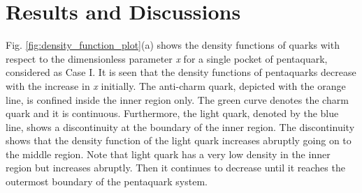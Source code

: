 \documentclass[fleqn]{article}
\begin{document}
\section{Results and Discussions}
     
    Fig. \ref{fig:density_function_plot}(a) shows the density functions of quarks with respect to the dimensionless parameter \textit{x} for a single pocket of pentaquark, considered as Case I. It is seen that the density functions of pentaquarks decrease with the increase in \textit{x} initially. The anti-charm quark, depicted with the orange line, is confined inside the inner region only. The green curve denotes the charm quark and it is continuous. Furthermore, the light quark, denoted by the blue line, shows a discontinuity at the boundary of the inner region. The discontinuity shows that the density function of the light quark increases abruptly going on to the middle region. Note that light quark has a very low density in the inner region but increases abruptly. Then it continues to decrease until it reaches the outermost boundary of the pentaquark system.      
        
        
        
\end{document}
